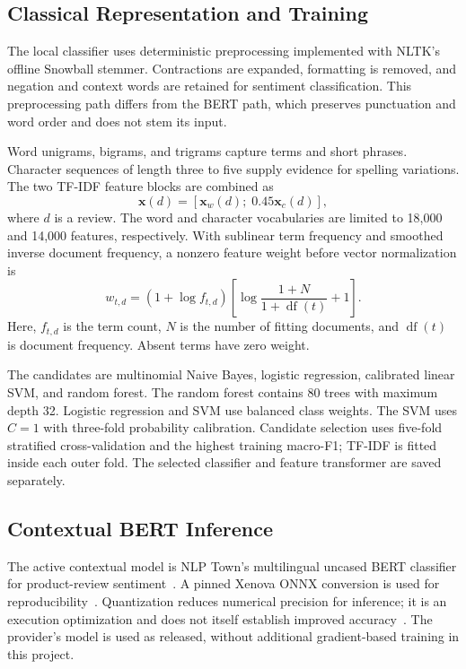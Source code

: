 \documentclass[conference,a4paper]{IEEEtran}
\begin{document}
\subsection{Classical Representation and Training}
The local classifier uses deterministic preprocessing implemented with NLTK's offline Snowball stemmer. Contractions are expanded, formatting is removed, and negation and context words are retained for sentiment classification. This preprocessing path differs from the BERT path, which preserves punctuation and word order and does not stem its input.

Word unigrams, bigrams, and trigrams capture terms and short phrases. Character sequences of length three to five supply evidence for spelling variations. The two TF-IDF feature blocks are combined as
\begin{equation}
\mathbf{x}(d)=[\mathbf{x}_{w}(d);\;0.45\mathbf{x}_{c}(d)],
\end{equation}
where $d$ is a review. The word and character vocabularies are limited to 18,000 and 14,000 features, respectively. With sublinear term frequency and smoothed inverse document frequency, a nonzero feature weight before vector normalization is
\begin{equation}
w_{t,d}=(1+\log f_{t,d})\left[\log\frac{1+N}{1+\operatorname{df}(t)}+1\right].
\end{equation}
Here, $f_{t,d}$ is the term count, $N$ is the number of fitting documents, and $\operatorname{df}(t)$ is document frequency. Absent terms have zero weight.

The candidates are multinomial Naive Bayes, logistic regression, calibrated linear SVM, and random forest. The random forest contains 80 trees with maximum depth 32. Logistic regression and SVM use balanced class weights. The SVM uses $C=1$ with three-fold probability calibration. Candidate selection uses five-fold stratified cross-validation and the highest training macro-F1; TF-IDF is fitted inside each outer fold. The selected classifier and feature transformer are saved separately.

\subsection{Contextual BERT Inference}
The active contextual model is NLP Town's multilingual uncased BERT classifier for product-review sentiment~\cite{nlptown}. A pinned Xenova ONNX conversion is used for reproducibility~\cite{xenova}. Quantization reduces numerical precision for inference; it is an execution optimization and does not itself establish improved accuracy~\cite{onnx}. The provider's model is used as released, without additional gradient-based training in this project.
\end{document}
